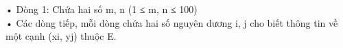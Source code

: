 • Dòng 1: Chứa hai số m, n (1 ≤ m, n ≤ 100)   
\\   • Các dòng tiếp, mỗi dòng chứa hai số nguyên dương i, j cho biết thông tin về một cạnh (xi, yj) thuộc E.